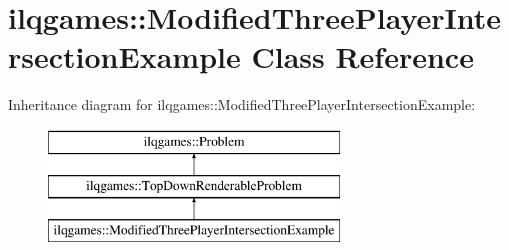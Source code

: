 \hypertarget{classilqgames_1_1_modified_three_player_intersection_example}{}\section{ilqgames\+:\+:Modified\+Three\+Player\+Intersection\+Example Class Reference}
\label{classilqgames_1_1_modified_three_player_intersection_example}
Inheritance diagram for ilqgames\+:\+:Modified\+Three\+Player\+Intersection\+Example\+:\begin{figure}[H]
\begin{center}
\leavevmode
\includegraphics[height=3.000000cm]{classilqgames_1_1_modified_three_player_intersection_example}
\end{center}
\end{figure}
